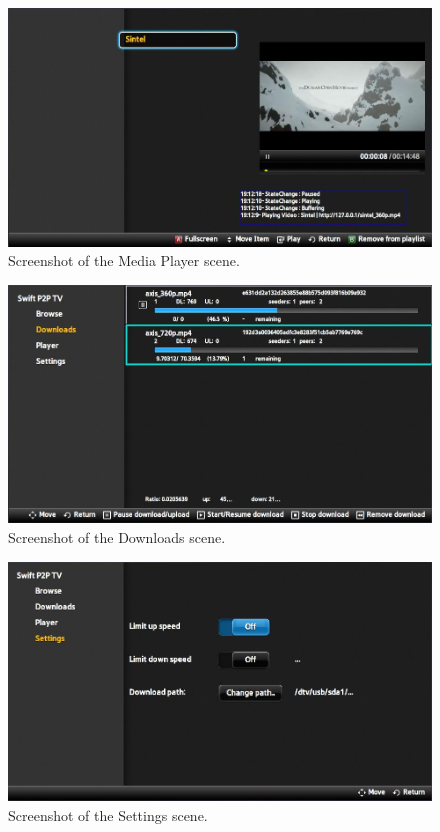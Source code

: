\begin{center}
\begin{figure}[h]
	\centering
	\mbox{\includegraphics[width=1.2\textwidth]{Images/PlayerScene.jpg}}
	\caption{Screenshot of the Media Player scene.}
\end{figure}
\end{center}

\begin{center}
\begin{figure}[h]
	\centering
	\mbox{\includegraphics[width=1.2\textwidth]{Images/DownloadsScene.jpg}}
	\caption{Screenshot of the Downloads scene.}
\end{figure}
\end{center}

\begin{center}
\begin{figure}[h]
	\centering
	\mbox{\includegraphics[width=1.2\textwidth]{Images/SettingsScene.jpg}}
	\caption{Screenshot of the Settings scene.}
\end{figure}
\end{center}

